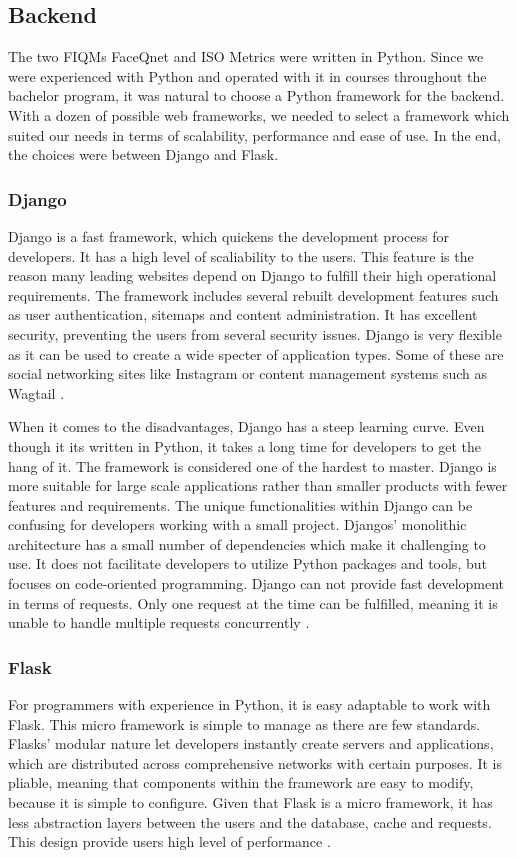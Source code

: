 \subsection{Backend}
The two FIQMs FaceQnet and ISO Metrics were written in Python. Since we were experienced with Python and operated with it in courses throughout the bachelor program, it was natural to choose a Python framework for the backend. With a dozen of possible web frameworks, we needed to select a framework which suited our needs in terms of scalability, performance and ease of use. In the end, the choices were between Django and Flask.

\subsubsection*{Django}
Django is a fast framework, which quickens the development process for developers. It has a high level of scaliability to the users. This feature is the reason many leading websites depend on Django to fulfill their high operational requirements. The framework includes several rebuilt development features such as user authentication, sitemaps and content administration. It has excellent security, preventing the users from several security issues. Django is very flexible as it can be used to create a wide specter of application types. Some of these are social networking sites like Instagram or content management systems such as Wagtail \cite{DjangoAdvantages}.

When it comes to the disadvantages, Django has a steep learning curve. Even though it its written in Python, it takes a long time for developers to get the hang of it. The framework is considered one of the hardest to master. Django is more suitable for large scale applications rather than smaller products with fewer features and requirements. The unique functionalities within Django can be confusing for developers working with a small project. Djangos' monolithic architecture has a small number of dependencies which make it challenging to use. It does not facilitate developers to utilize Python packages and tools, but focuses on code-oriented programming. Django can not provide fast development in terms of requests. Only one request at the time can be fulfilled, meaning it is unable to handle multiple requests concurrently \cite{DjangoDisadvantages}.

\subsubsection*{Flask}
\label{sec:flask}
For programmers with experience in Python, it is easy adaptable to work with Flask. This micro framework is simple to manage as there are few standards. Flasks' modular nature let developers instantly create servers and applications, which are distributed across comprehensive networks with certain purposes. It is pliable, meaning that components within the framework are easy to modify, because it is simple to configure. Given that Flask is a micro framework, it has less abstraction layers between the users and the database, cache and requests. This design provide users high level of performance \cite{DjangoAdvantages}.

